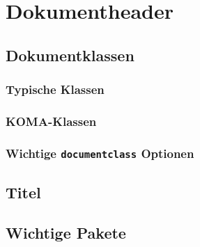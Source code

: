 \section{Dokumentheader}

\subsection{Dokumentklassen}

\subsubsection{Typische Klassen}

\subsubsection{KOMA-Klassen}

\subsubsection{Wichtige \texttt{documentclass} Optionen}

\subsection{Titel}

\subsection{Wichtige Pakete}

\newpage